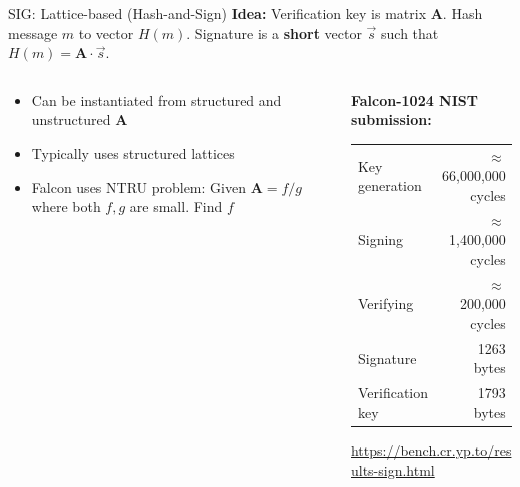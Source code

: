 \documentclass[xcolor=table,10pt,aspectratio=169]{beamer}
\begin{document}
\begin{frame}[label={sec:orge765b2a}]{SIG: Lattice-based (Hash-and-Sign)}
\textbf{Idea:} Verification key is matrix \(\mathbf{A}\). Hash message \(m\) to vector \(H(m)\). Signature is a \textbf{short} vector \(\vec{s}\) such that \(H(m) = \mathbf{A}\cdot \vec{s}\).

\begin{columns}[t]
\begin{column}{0.5\columnwidth}
\begin{itemize}
\item Can be instantiated from structured and unstructured \(\mathbf{A}\)
\item Typically uses structured lattices
\item Falcon uses NTRU problem: Given \(\mathbf{A} = f/g\) where both \(f,g\) are small. Find \(f\)
\end{itemize}
\end{column}

\begin{column}{0.5\columnwidth}
\textbf{Falcon-1024 NIST submission:}

\begin{center}
\begin{tabular}{lr}
Key generation & \(\approx\) 66,000,000 cycles\\
Signing & \(\approx\)  1,400,000 cycles\\
Verifying & \(\approx\)    200,000 cycles\\
Signature & 1263 bytes\\
Verification key & 1793 bytes\\
\end{tabular}

\end{center}

\small \url{https://bench.cr.yp.to/results-sign.html}
\end{column}
\end{columns}
\end{frame}
\end{document}
